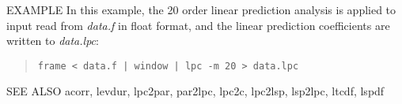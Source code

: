 \begin{options}
\end{options}

\begin{qsection}{EXAMPLE}
In this example, the 20 order linear prediction analysis is applied
to input read from {\em data.f} in float format,
and the linear prediction coefficients are written to
{\em data.lpc}:
\begin{quote}
 \verb!frame < data.f | window | lpc -m 20 > data.lpc!
\end{quote} 
\end{qsection}

\begin{qsection}{SEE ALSO}
 acorr, levdur, lpc2par, par2lpc, lpc2c, lpc2lsp, lsp2lpc, 
 ltcdf, lspdf
\end{qsection}
